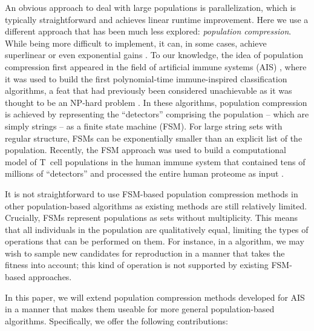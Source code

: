 \documentclass{llncs}
\begin{document}
An obvious approach to deal with large populations is parallelization, which is typically straightforward and achieves linear runtime improvement. Here we use a different approach that has been much less explored: \emph{population compression}. While being more difficult to implement, it can, in some cases, achieve superlinear or even exponential gains \cite{Liskiewicz2010}. To our knowledge, the idea of population compression first appeared in the field of artificial immune systems (AIS) \cite{Elberfeld_2009}, where it was used to build the first polynomial-time immune-inspired classification algorithms, a feat that had previously been considered unachievable as it was thought to be an NP-hard problem \cite{Timmis2008}. In these algorithms, population compression is achieved by representing the ``detectors'' comprising the population -- which are simply strings -- as a finite state machine (FSM). For large string sets with regular structure, FSMs can be exponentially smaller than an explicit list of the population. Recently, the FSM approach was used to build a computational model of T~cell populations in the human immune system that contained tens of millions of ``detectors'' and processed the entire human proteome as input \cite{Wortel2020t}. 

It is not straightforward to use FSM-based population compression methods in other
population-based algorithms as existing methods are still relatively limited. 
Crucially, FSMs represent populations as sets without multiplicity. 
This means that all individuals in the population are qualitatively equal,  
limiting the types of operations that can be performed on them. For instance, 
in a algorithm, we may wish to sample new candidates for reproduction in a manner that takes the fitness into account; this kind of operation is not 
supported by existing FSM-based approaches.

In this paper, we will extend population compression methods developed for AIS in a manner
that makes them useable for more general population-based algorithms. Specifically, we 
offer the following contributions: 
\end{document}

